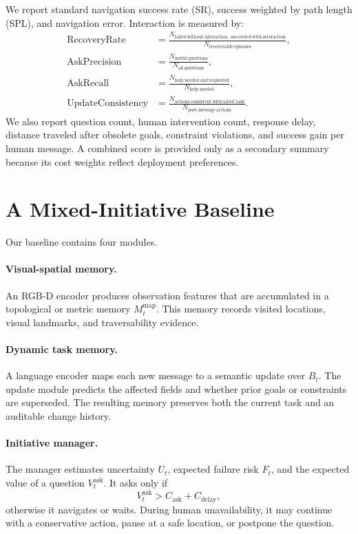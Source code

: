 \documentclass[10pt]{article}
\begin{document}
We report standard navigation success rate (SR), success weighted by path
length (SPL), and navigation error. Interaction is measured by:
\begin{align}
  \mathrm{RecoveryRate}&=
  \frac{N_{\mathrm{failed\ without\ interaction,\ succeeded\ with\ interaction}}}
       {N_{\mathrm{recoverable\ episodes}}},\\
  \mathrm{AskPrecision}&=
  \frac{N_{\mathrm{useful\ questions}}}{N_{\mathrm{all\ questions}}},\\
  \mathrm{AskRecall}&=
  \frac{N_{\mathrm{help\ needed\ and\ requested}}}
       {N_{\mathrm{help\ needed}}},\\
  \mathrm{UpdateConsistency}&=
  \frac{N_{\mathrm{actions\ consistent\ with\ latest\ task}}}
       {N_{\mathrm{post\text{-}message\ actions}}}.
\end{align}
We also report question count, human intervention count, response delay,
distance traveled after obsolete goals, constraint violations, and success
gain per human message. A combined score is provided only as a secondary
summary because its cost weights reflect deployment preferences.

\section{A Mixed-Initiative Baseline}
\label{sec:method}

Our baseline contains four modules.

\paragraph{Visual-spatial memory.}
An RGB-D encoder produces observation features that are accumulated in a
topological or metric memory $M_t^{\mathrm{map}}$. This memory records visited
locations, visual landmarks, and traversability evidence.

\paragraph{Dynamic task memory.}
A language encoder maps each new message to a semantic update over $B_t$.
The update module predicts the affected fields and whether prior goals or
constraints are superseded. The resulting memory preserves both the current
task and an auditable change history.

\paragraph{Initiative manager.}
The manager estimates uncertainty $U_t$, expected failure risk $F_t$, and the
expected value of a question $V_t^{\mathrm{ask}}$. It asks only if
\begin{equation}
  V_t^{\mathrm{ask}}>C_{\mathrm{ask}}+C_{\mathrm{delay}},
\end{equation}
otherwise it navigates or waits. During human unavailability, it may continue
with a conservative action, pause at a safe location, or postpone the
question.
\end{document}
